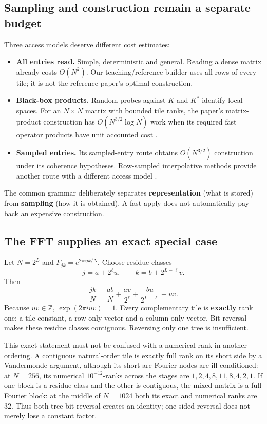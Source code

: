 \subsection{Sampling and construction remain a separate budget}
Three access models deserve different cost estimates:
\begin{itemize}
 \item \textbf{All entries read.} Simple, deterministic and general. Reading a dense matrix already costs $\Theta(N^2)$. Our teaching/reference builder uses all rows of every tile; it is not the reference paper's optimal construction.
 \item \textbf{Black-box products.} Random probes against $K$ and $K^*$ identify local spaces. For an $N\times N$ matrix with bounded tile ranks, the paper's matrix-product construction has $O(N^{3/2}\log N)$ work when its required fast operator products have unit accounted cost \cite{li2015butterfly}.
 \item \textbf{Sampled entries.} Its sampled-entry route obtains $O(N^{3/2})$ construction under its coherence hypotheses. Row-sampled interpolative methods provide another route with a different access model \cite{pang2018idbf}.
\end{itemize}
The common grammar deliberately separates \textbf{representation} (what is stored) from \textbf{sampling} (how it is obtained). A fast apply does not automatically pay back an expensive construction.

\subsection{The FFT supplies an exact special case}
Let $N=2^L$ and $F_{jk}=e^{2\pi ijk/N}$. Choose residue classes
\[
j=a+2^\ell u,\qquad k=b+2^{L-\ell}v.
\]
Then
\[
\frac{jk}{N}
=\frac{ab}{N}+\frac{av}{2^\ell}+\frac{bu}{2^{L-\ell}}+uv.
\]
Because $uv\in\mathbb Z$, $\exp(2\pi iuv)=1$. Every complementary tile is \textbf{exactly} rank one: a tile constant, a row-only vector and a column-only vector. Bit reversal makes these residue classes contiguous. Reversing only one tree is insufficient.

This exact statement must not be confused with a numerical rank in another ordering. A contiguous natural-order tile is exactly full rank on its short side by a Vandermonde argument, although its short-arc Fourier nodes are ill conditioned: at $N=256$, its numerical $10^{-12}$-ranks across the stages are $1,2,4,8,11,8,4,2,1$. If one block is a residue class and the other is contiguous, the mixed matrix is a full Fourier block: at the middle of $N=1024$ both its exact and numerical ranks are $32$. Thus both-tree bit reversal creates an identity; one-sided reversal does not merely lose a constant factor.

